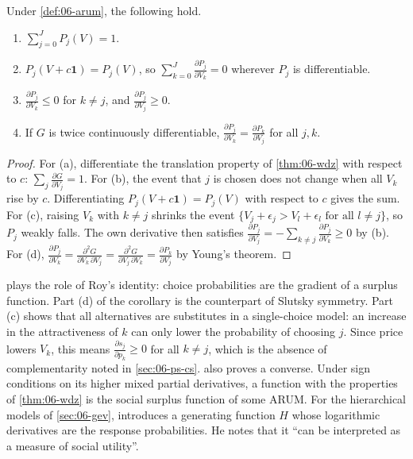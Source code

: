 \begin{corollary}\label{cor:06-wdz}
Under \cref{def:06-arum}, the following hold.
\begin{enumerate}[label=(\alph*)]
  \item $\sum_{j=0}^J P_j(V) = 1$.
  \item $P_j(V + c\mathbf{1}) = P_j(V)$, so $\sum_{k=0}^J \frac{\partial P_j}{\partial V_k} = 0$ wherever $P_j$ is
  differentiable.
  \item $\frac{\partial P_j}{\partial V_k} \le 0$ for $k \neq j$, and $\frac{\partial P_j}{\partial V_j} \ge 0$.
  \item If $G$ is twice continuously differentiable,
  $\frac{\partial P_j}{\partial V_k} = \frac{\partial P_k}{\partial V_j}$ for all $j, k$.
\end{enumerate}
\end{corollary}

\begin{proof}
For (a), differentiate the translation property of \cref{thm:06-wdz} with respect to $c$:
$\sum_j \frac{\partial G}{\partial V_j} = 1$. For (b), the event that $j$ is chosen does not change when all
$V_k$ rise by $c$. Differentiating $P_j(V + c\mathbf{1}) = P_j(V)$ with respect to $c$ gives the sum. For (c),
raising $V_k$ with $k \neq j$ shrinks the event $\{V_j + \epsilon_j > V_l + \epsilon_l \text{ for all } l \neq j\}$,
so $P_j$ weakly falls. The own derivative then satisfies
$\frac{\partial P_j}{\partial V_j} = -\sum_{k\neq j}\frac{\partial P_j}{\partial V_k} \ge 0$ by (b). For (d),
$\frac{\partial P_j}{\partial V_k} = \frac{\partial^2 G}{\partial V_k\,\partial V_j}
= \frac{\partial^2 G}{\partial V_j\,\partial V_k} = \frac{\partial P_k}{\partial V_j}$ by Young's theorem.
\end{proof}

 plays the role of Roy's identity: choice probabilities are the gradient of a surplus function.
Part (d) of the corollary is the counterpart of Slutsky symmetry. Part (c) shows that all alternatives are
substitutes in a single-choice model: an increase in the attractiveness of $k$ can only lower the probability
of choosing $j$. Since price lowers $V_k$, this means $\frac{\partial s_j}{\partial p_k} \ge 0$ for all
$k \neq j$, which is the absence of complementarity noted in \cref{sec:06-ps-cs}.  also
proves a converse. Under sign conditions on its higher mixed partial derivatives, a function with the properties
of \cref{thm:06-wdz} is the social surplus function of some ARUM. For the hierarchical models of
\cref{sec:06-gev}, \citet[p.~1425]{McFadden1984} introduces a generating function $H$ whose logarithmic
derivatives are the response probabilities. He notes that it ``can be interpreted as a measure of social
utility''.

